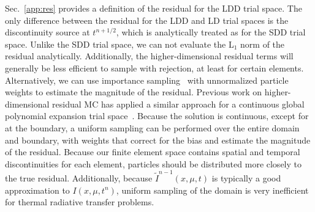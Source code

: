 \documentclass{anstrans}
\begin{document}
Sec.~\ref{app:res} provides a definition of the residual for the LDD trial space.
The only difference between the residual for the LDD and LD trial spaces is the discontinuity source
at $t^{n+1/2}$, which is analytically treated as for the SDD trial space.
Unlike the SDD trial space, we can not evaluate the L$_1$ norm of the residual analytically.
Additionally, the higher-dimensional residual terms will generally be less efficient to sample with rejection, at
least for certain elements.  Alternatively, we can use importance sampling~\cite{shultis_mc} with
unnormalized particle weights to estimate the magnitude of the
residual.
Previous work on higher-dimensional residual MC has  applied a similar approach for a continuous
global polynomial expansion trial space~\cite{favorite_ecmc}.  Because the solution is continuous, except for at the
boundary, a uniform sampling can be performed over the entire domain and boundary, with weights that
correct for the bias and estimate the magnitude of the residual.  Because our finite element space
contains spatial and temporal discontinuities for each element, particles should be distributed more
closely to the true residual.  Additionally, because $\tilde I^{n-1}(x,\mu,t)$ is typically a good
approximation to $I(x,\mu,t^{n})$, uniform sampling of the domain is very inefficient for thermal
radiative transfer problems.
\end{document}
